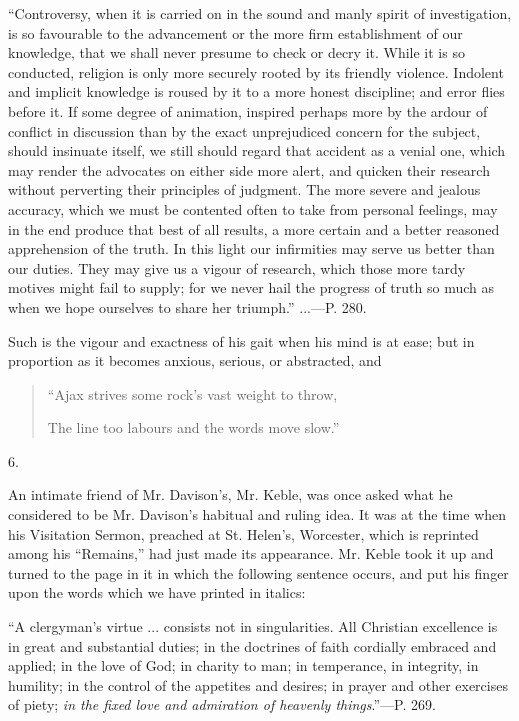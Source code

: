 ``Controversy,
when it is carried on in the sound and manly spirit of investigation,
is so favourable to the advancement or the more firm establishment of
our knowledge, that we shall never presume to check or decry it. While
it is so conducted, religion is only more securely rooted by its
friendly violence. Indolent and implicit knowledge is roused by it to
a more honest discipline; and error
flies before it. If some degree of animation, inspired perhaps more by
the ardour of conflict in discussion than by the exact unprejudiced
concern for the subject, should insinuate itself, we still should
regard that accident as a venial one, which may render the advocates
on either side more alert, and quicken their research without
perverting their principles of judgment. The more severe and jealous
accuracy, which we must be contented often to take from personal
feelings, may in the end produce that best of all results, a more
certain and a better reasoned apprehension of the truth. In this light
our infirmities may serve us better than our duties. They may give us
a vigour of research, which those more tardy motives might fail to
supply; for we never hail the progress of truth so much as when we
hope ourselves to share her triumph.'' ...—P. 280.

Such is the vigour and exactness of his gait when
his mind is at ease; but in proportion as it becomes anxious, serious,
or abstracted, and

\begin{quote}

``Ajax strives some rock's vast
weight to throw,

The line too labours and the words move slow.''

\end{quote}

6.

An intimate friend of Mr. Davison's, Mr. Keble,
was once asked what he considered to be Mr. Davison's habitual and
ruling idea. It was at the time when his Visitation Sermon, preached
at St. Helen's, Worcester, which is reprinted among his ``Remains,'' had
just made its appearance. Mr. Keble took it up and turned to the page
in it in which the following sentence occurs, and put his finger upon
the words which we have printed in italics:

``A
clergyman's virtue ... consists not in singularities. All Christian
excellence is in great and substantial duties; in the doctrines of
faith cordially embraced and applied; in the love of God; in charity
to man; in temperance, in integrity, in humility; in the control of
the appetites and desires; in prayer and other exercises of piety; \emph{in
the fixed love and admiration of heavenly things}.''—P. 269.

